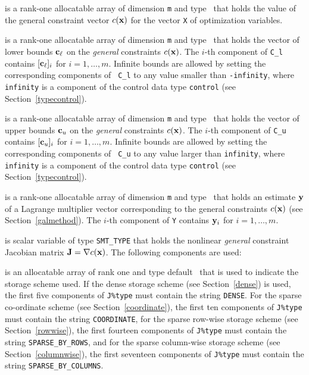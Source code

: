\documentclass{galahad}
\newcommand{\Grad}{\nabla}
\begin{document}
\begin{description}
\begin{description}
\end{description}

 is a rank-one allocatable array of dimension {\tt m}
and type \realdp\ that holds the value of the general
constraint vector $c({\mathbf{x}})$ for the vector {\tt X} of optimization variables. 

 is a rank-one allocatable array of dimension {\tt m}
and type \realdp\ that holds the vector of lower bounds
${\mathbf{c}}_\ell$ on the {\em general} constraints $c({\mathbf{x}})$. The $i$-th component of
{\tt C\_l} contains $[{\mathbf{c}}_\ell]_i$ for $i = 1, \ldots , m$.  Infinite
bounds are allowed by setting the corresponding components of {\tt
  C\_l} to any value smaller than {\tt -infinity}, where {\tt
  infinity} is a component of the control data type {\tt control} (see
Section~\ref{typecontrol}).

  is a rank-one allocatable array of dimension {\tt m}
and type \realdp\ that holds the vector of upper bounds
${\mathbf{c}}_u$ on the {\em general} constraints $c({\mathbf{x}})$. The $i$-th component of
{\tt C\_u} contains $[{\mathbf{c}}_u]_i$ for $i = 1, \ldots , m$.  Infinite
bounds are allowed by setting the corresponding components of {\tt
  C\_u} to any value larger than {\tt infinity}, where {\tt
  infinity} is a component of the control data type {\tt control} (see
Section~\ref{typecontrol}).

 is a rank-one allocatable array of dimension {\tt m} and type 
\realdp\ that holds an estimate ${\mathbf{y}}$ of a Lagrange
multiplier vector corresponding to the general constraints $c({\mathbf{x}})$ (see Section~\ref{galmethod}).
The $i$-th component of {\tt Y} contains ${\mathbf{y}}_{i}$ for $i = 1,  \ldots , m$.


 is scalar variable of type {\tt SMT\_TYPE} that holds the
nonlinear {\em general} constraint Jacobian matrix $\bmJ = \Grad c(\bmx)$. The
following components are used:

\begin{description}

 is an allocatable array of rank one and type default 
\character\ that
is used to indicate the storage scheme used. If the dense storage scheme 
(see Section~\ref{dense}) is used, 
the first five components of {\tt J\%type} must contain the
string {\tt DENSE}.
For the sparse co-ordinate scheme (see Section~\ref{coordinate}), 
the first ten components of {\tt J\%type} must contain the
string {\tt COORDINATE},  
for the sparse row-wise storage scheme (see Section~\ref{rowwise}),
the first fourteen components of {\tt J\%type} must contain the
string {\tt SPARSE\_BY\_ROWS},
and for the sparse column-wise storage scheme (see Section~\ref{columnwise}),
the first seventeen components of {\tt J\%type} must contain the
string {\tt SPARSE\_BY\_COLUMNS}.


\end{description}
\end{description}
\end{document}
